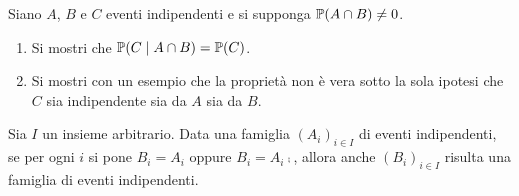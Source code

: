 Siano $A$, $B$ e $C$ eventi indipendenti e si supponga $\mathbb{P}( A\cap B) \neq 0$.
\begin{enumerate}
\item Si mostri che $\mathbb{P}( C\mid A\cap B) =\mathbb{P}( C)$.
\item Si mostri con un esempio che la proprietà non è vera sotto la sola ipotesi che $C$ sia indipendente sia da $A$ sia da $B$.
\end{enumerate}
\Esercizio{}

Sia $I$ un insieme arbitrario. Data una famiglia $( A_{i})_{i\in I}$ di eventi indipendenti, se per ogni $i$ si pone $B_{i} =A_{i}$ oppure $B_{i} =A_{i}\comp$, allora anche $( B_{i})_{i\in I}$ risulta una famiglia di eventi indipendenti.


\ParteSoluzioni



\Soluzione

